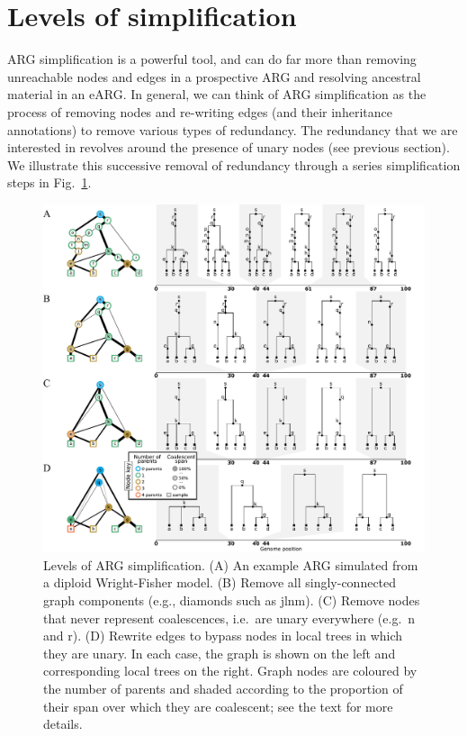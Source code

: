 \documentclass{article}
\newcommand{\noderef}[1]{\textsf{#1}}
\begin{document}
\section{Levels of simplification}
\label{sec-ARG-simplification}
ARG simplification is a powerful tool, and can do far more
than removing unreachable nodes and edges in a prospective ARG
and resolving ancestral material in an eARG.
In general, we can think of
ARG simplification as the process
of removing nodes and re-writing edges (and their inheritance annotations)
to remove various types of redundancy.
The redundancy that we are interested in
revolves around the presence of unary nodes (see previous section).
We illustrate this successive removal of redundancy
through a series simplification steps
in Fig.~\ref{fig-simplification}.

\begin{figure}
\centering
\includegraphics[width=\textwidth]{illustrations/simplification}
\caption{\label{fig-simplification}
Levels of ARG simplification.
(A) An example ARG simulated from a diploid Wright-Fisher model.
(B) Remove all
singly-connected graph components (e.g., diamonds such as \noderef{jlnm}).
(C) Remove nodes that never represent coalescences,
i.e.\ are unary everywhere (e.g.\ \noderef{n} and \noderef{r}).
(D) Rewrite edges to bypass nodes in local trees in which they are unary.
In each case, the graph is shown on the left
and corresponding local trees on the right.
Graph nodes are coloured by the number of parents and shaded
according to the proportion of their span over which they are coalescent;
see the text for more details.
}
\end{figure}
\end{document}
